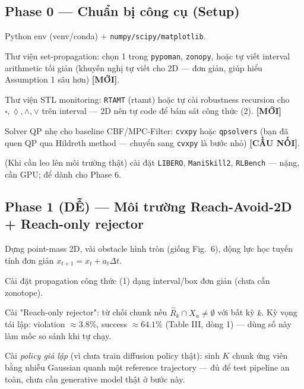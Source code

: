 \documentclass[a4paper,12pt]{article}
\newcommand{\new}{\textcolor{red!60!black}{\textbf{[MỚI]}}}
\newcommand{\bridge}{\textcolor{blue!50!black}{\textbf{[CẦU NỐI]}}}
\begin{document}
\subsection{Phase 0 --- Chuẩn bị công cụ (Setup)}
\begin{tasklist}
  \item[\square] Python env (venv/conda) + \texttt{numpy/scipy/matplotlib}.
  \item[\square] Thư viện set-propagation: chọn 1 trong \texttt{pypoman}, \texttt{zonopy}, hoặc tự viết interval arithmetic tối giản (khuyến nghị tự viết cho 2D — đơn giản, giúp hiểu Assumption 1 sâu hơn) \new.
  \item[\square] Thư viện STL monitoring: \texttt{RTAMT} (rtamt) hoặc tự cài robustness recursion cho $\square,\lozenge,\wedge,\vee$ trên interval — 2D nên tự code để bám sát công thức (2). \new
  \item[\square] Solver QP nhẹ cho baseline CBF/MPC-Filter: \texttt{cvxpy} hoặc \texttt{qpsolvers} (bạn đã quen QP qua Hildreth method — chuyển sang \texttt{cvxpy} là bước nhỏ) \bridge.
  \item[\square] (Khi cần leo lên môi trường thật) cài đặt \texttt{LIBERO}, \texttt{ManiSkill2}, \texttt{RLBench} — nặng, cần GPU; để dành cho Phase 6.
\end{tasklist}

\subsection{Phase 1 (DỄ) --- Môi trường Reach-Avoid-2D + Reach-only rejector}
\begin{tasklist}
  \item[\square] Dựng point-mass 2D, vài obstacle hình tròn (giống Fig.~6), động lực học tuyến tính đơn giản $x_{t+1}=x_t+a_t\Delta t$.
  \item[\square] Cài đặt propagation công thức (1) dạng interval/box đơn giản (chưa cần zonotope).
  \item[\square] Cài "Reach-only rejector": từ chối chunk nếu $\hat R_k \cap X_u \ne \emptyset$ với bất kỳ $k$. Kỳ vọng tái lập: violation $\approx 3.8\%$, success $\approx 64.1\%$ (Table III, dòng 1) — dùng số này làm mốc so sánh khi tự chạy.
  \item[\square] Cài \emph{policy giả lập} (vì chưa train diffusion policy thật): sinh $K$ chunk ứng viên bằng nhiễu Gaussian quanh một reference trajectory — đủ để test pipeline an toàn, chưa cần generative model thật ở bước này.
\end{tasklist}
\end{document}
